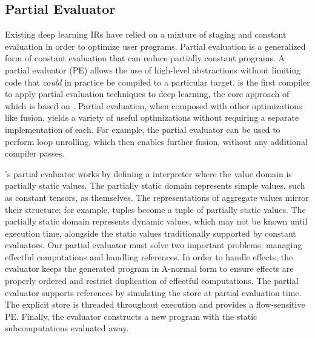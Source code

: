 \subsection{Partial Evaluator}
\label{sec:partial_eval}
Existing deep learning IRs have relied on
  a mixture of staging and constant evaluation
  in order to optimize user programs.
Partial evaluation is a generalized form of constant
  evaluation that can reduce partially constant
  programs.
A partial evaluator (PE) allows the use of high-level abstractions
  without limiting code that \textit{could} in practice be
  compiled to a particular target.
\relay is the first compiler to apply partial evaluation
  techniques to deep learning, the
  core approach of which is based on \citep{pe_ref}.
Partial evaluation, when composed with other
  optimizations like fusion, yields a variety
  of useful optimizations without requiring
  a separate implementation of each.
For example, the partial evaluator can be used to perform
  loop unrolling, which then enables further fusion,
  without any additional compiler passes.

\relay's partial evaluator works by defining a interpreter
  where the value domain is partially static values.
The partially static domain represents simple values,
  such as constant tensors, as themselves.
The representations
  of aggregate values mirror their structure; for example,
  tuples become a tuple of partially static values.
The partially static domain represents dynamic values,
  which may not be known until execution time,
  alongside the static values traditionally supported by
  constant evaluators.
Our partial evaluator must solve two important problems:
  managing effectful computations and handling references.
In order to handle effects, the evaluator keeps the generated
  program in A-normal form to ensure effects are properly ordered
  and restrict duplication of effectful computations.
The partial evaluator supports references by
  simulating the store at partial evaluation time.
The explicit store is threaded throughout execution
  and provides a flow-sensitive PE.
Finally, the evaluator constructs a new program with
  the static subcomputations evaluated away.

